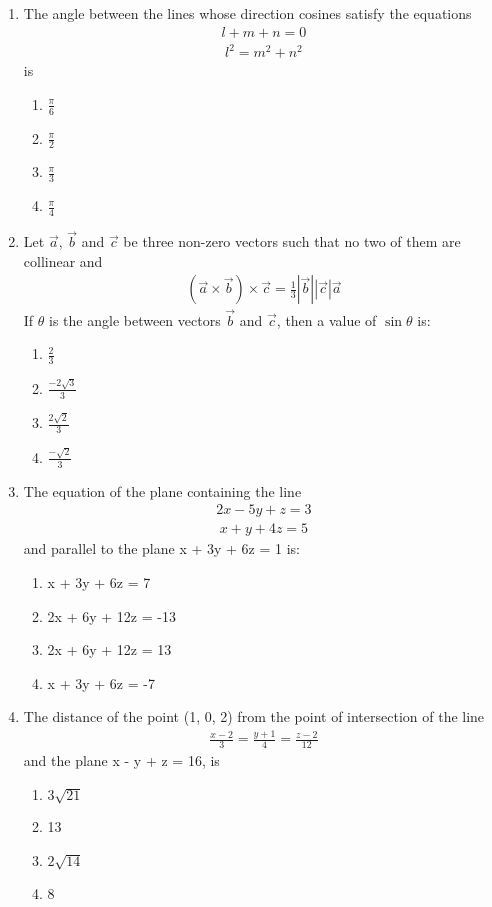 \begin{enumerate}[label=\arabic*.,ref=\thesubsection.\theenumi]
\item The angle between the lines whose direction cosines satisfy the equations
\begin{align*}
l + m + n = 0
\end{align*}
\begin{align*}
l^2 = m^2 + n^2
\end{align*}
is
\begin{enumerate}
\item $\frac{\pi}{6}$
\item $\frac{\pi}{2}$
\item $\frac{\pi}{3}$
\item $\frac{\pi}{4}$
\end{enumerate}

\item Let $\overrightarrow{a}$, $\overrightarrow{b}$ and $\overrightarrow{c}$ be three non-zero vectors such that no two of them are collinear and 
\begin{align*}
(\overrightarrow{a} \times \overrightarrow{b}) \times \overrightarrow{c} = \frac{1}{3}|\overrightarrow{b}||\overrightarrow{c}|\overrightarrow{a}
\end{align*}
If $\theta$ is the angle between vectors $\overrightarrow{b}$ and $\overrightarrow{c}$, then a value of $\sin\theta$ is:
\begin{enumerate}
\item $\frac{2}{3}$
\item $\frac{-2\sqrt{3}}{3}$
\item $\frac{2\sqrt{2}}{3}$
\item $\frac{-\sqrt{2}}{3}$
\end{enumerate}

\item The equation of the plane containing the line
\begin{align*}
2x - 5y + z = 3
\end{align*}
\begin{align*}
x + y + 4z = 5
\end{align*}
and parallel to the plane x + 3y + 6z = 1 is:
\begin{enumerate}
\item x + 3y + 6z = 7
\item 2x + 6y + 12z = -13
\item 2x + 6y + 12z = 13
\item x + 3y + 6z = -7
\end{enumerate}

\item The distance of the point (1, 0, 2) from the point of intersection of the line 
\begin{align*}
\frac{x-2}{3} = \frac{y+1}{4} = \frac{z-2}{12}
\end{align*}
and the plane x - y + z = 16, is
\begin{enumerate}
\item $3\sqrt{21}$
\item 13
\item $2\sqrt{14}$
\item 8
\end{enumerate}


\end{enumerate}
